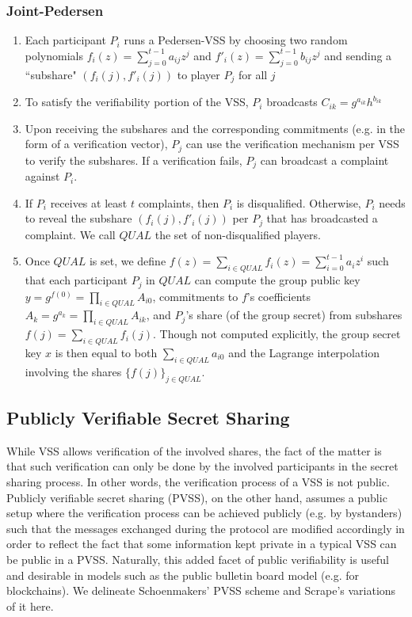 \documentclass[11pt]{article}
\theoremstyle{definition}
\theoremstyle{remark}
\begin{document}
\subsubsection{Joint-Pedersen}
\begin{enumerate}
\item Each participant $P_i$ runs a Pedersen-VSS by choosing two random polynomials $f_i(z) = \sum_{j = 0}^{t - 1} a_{ij} z^j$ and $f'_i(z) = \sum_{j = 0}^{t - 1} b_{ij} z^j$ and sending a ``subshare" $(f_i(j), f'_i(j))$ to player $P_j$ for all $j$
\item To satisfy the verifiability portion of the VSS, $P_i$ broadcasts $C_{ik} = g^{a_{ik}} h^{b_{ik}}$
\item Upon receiving the subshares and the corresponding commitments (e.g. in the form of a verification vector), $P_j$ can use the verification mechanism per VSS to verify the subshares. If a verification fails, $P_j$ can broadcast a complaint against $P_i$.
\item If $P_i$ receives at least $t$ complaints, then $P_i$ is disqualified. Otherwise, $P_i$ needs to reveal the subshare $(f_i(j), f'_i(j))$ per $P_j$ that has broadcasted a complaint. We call $QUAL$ the set of non-disqualified players.
\item Once $QUAL$ is set, we define $f(z) = \sum_{i \in QUAL} f_i(z) = \sum_{i = 0}^{t - 1} a_i z^i$ such that each participant $P_j$ in $QUAL$ can compute the group public key $y = g^{f(0)} = \prod_{i \in QUAL} A_{i0}$, commitments to $f$'s coefficients $A_k = g^{a_k} = \prod_{i \in QUAL} A_{ik}$, and $P_j$'s share (of the group secret) from subshares $f(j) = \sum_{i \in QUAL} f_i(j)$. Though not computed explicitly, the group secret key $x$ is then equal to both $\sum_{i \in QUAL} a_{i0}$ and the Lagrange interpolation involving the shares $\{f(j)\}_{j \in QUAL}$.
\end{enumerate}



\subsection{Publicly Verifiable Secret Sharing}
While VSS allows verification of the involved shares, the fact of the matter is that such verification can only be done by the involved participants in the secret sharing process. In other words, the verification process of a VSS is not public. Publicly verifiable secret sharing (PVSS), on the other hand, assumes a public setup where the verification process can be achieved publicly (e.g. by bystanders) such that the messages exchanged during the protocol are modified accordingly in order to reflect the fact that some information kept private in a typical VSS can be public in a PVSS. Naturally, this added facet of public verifiability is useful and desirable in models such as the public bulletin board model (e.g. for blockchains). We delineate Schoenmakers' PVSS scheme and Scrape's variations of it here.
\end{document}
